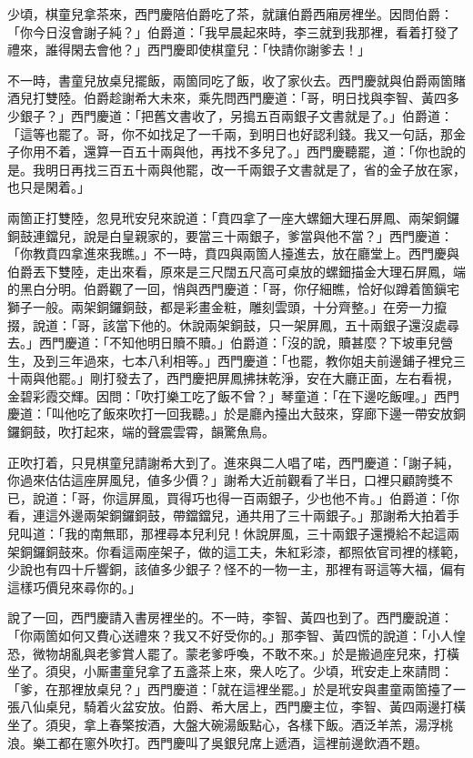 少頃，棋童兒拿茶來，西門慶陪伯爵吃了茶，就讓伯爵西廂房裡坐。因問伯爵：「你今日沒會謝子純？」伯爵道：「我早晨起來時，李三就到我那裡，看着打發了禮來，誰得閑去會他？」西門慶即使棋童兒：「快請你謝爹去！」

不一時，書童兒放桌兒擺飯，兩箇同吃了飯，收了家伙去。西門慶就與伯爵兩箇賭酒兒打雙陸。伯爵趁謝希大未來，乘先問西門慶道：「哥，明日找與李智、黃四多少銀子？」西門慶道：「把舊文書收了，另搗五百兩銀子文書就是了。」伯爵道：「這等也罷了。哥，你不如找足了一千兩，到明日也好認利錢。我又一句話，那金子你用不着，還算一百五十兩與他，再找不多兒了。」西門慶聽罷，道：「你也說的是。我明日再找三百五十兩與他罷，改一千兩銀子文書就是了，省的金子放在家，也只是閑着。」

兩箇正打雙陸，忽見玳安兒來說道：「賁四拿了一座大螺鈿大理石屏鳳、兩架銅鑼銅鼓連鐺兒，說是白皇親家的，要當三十兩銀子，爹當與他不當？」西門慶道：「你教賁四拿進來我瞧。」不一時，賁四與兩箇人擡進去，放在廳堂上。西門慶與伯爵丟下雙陸，走出來看，原來是三尺闊五尺高可桌放的螺鈿描金大理石屏鳳，端的黑白分明。伯爵觀了一回，悄與西門慶道：「哥，你仔細瞧，恰好似蹲着箇鎭宅獅子一般。兩架銅鑼銅鼓，都是彩畫金粧，雕刻雲頭，十分齊整。」在旁一力攛掇，說道：「哥，該當下他的。休說兩架銅鼓，只一架屏鳳，五十兩銀子還沒處尋去。」西門慶道：「不知他明日贖不贖。」伯爵道：「沒的說，贖甚麼？下坡車兒營生，及到三年過來，七本八利相等。」西門慶道：「也罷，教你姐夫前邊鋪子裡兌三十兩與他罷。」剛打發去了，西門慶把屏鳳拂抹乾淨，安在大廳正面，左右看視，金碧彩霞交輝。因問：「吹打樂工吃了飯不曾？」琴童道：「在下邊吃飯哩。」西門慶道：「叫他吃了飯來吹打一回我聽。」於是廳內擡出大鼓來，穿廊下邊一帶安放銅鑼銅鼓，吹打起來，端的聲震雲霄，韻驚魚鳥。

正吹打着，只見棋童兒請謝希大到了。進來與二人唱了喏，西門慶道：「謝子純，你過來估估這座屏風兒，値多少價？」謝希大近前觀看了半日，口裡只顧誇獎不已，說道：「哥，你這屏風，買得巧也得一百兩銀子，少也他不肯。」伯爵道：「你看，連這外邊兩架銅鑼銅鼓，帶鐺鐺兒，通共用了三十兩銀子。」那謝希大拍着手兒叫道：{}「我的南無耶，那裡尋本兒利兒！休說屏風，三十兩銀子還攪給不起這兩架銅鑼銅鼓來。你看這兩座架子，做的這工夫，朱紅彩漆，都照依官司裡的樣範，少說也有四十斤響銅，該値多少銀子？怪不的一物一主，那裡有哥這等大福，偏有這樣巧價兒來尋你的。」

說了一回，西門慶請入書房裡坐的。不一時，李智、黃四也到了。西門慶說道：「你兩箇如何又費心送禮來？我又不好受你的。」那李智、黃四慌的說道：「小人惶恐，微物胡亂與老爹賞人罷了。蒙老爹呼喚，不敢不來。」於是搬過座兒來，打橫坐了。須臾，小厮畫童兒拿了五盞茶上來，衆人吃了。少頃，玳安走上來請問：「爹，在那裡放桌兒？」西門慶道：「就在這裡坐罷。」於是玳安與畫童兩箇擡了一張八仙桌兒，騎着火盆安放。伯爵、希大居上，西門慶主位，李智、黃四兩邊打橫坐了。須臾，拿上春檠按酒，大盤大碗湯飯點心，各樣下飯。酒泛羊羔，湯浮桃浪。樂工都在窻外吹打。西門慶叫了吳銀兒席上遞酒，這裡前邊飲酒不題。

